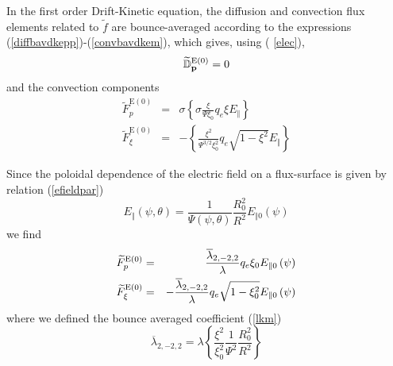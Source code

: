 

In the first order Drift-Kinetic equation, the diffusion and convection flux
elements related to $\widetilde{f}$ are bounce-averaged according to the
expressions (\ref{diffbavdkepp})-(\ref{convbavdkem}), which gives, using (%
\ref{elec}),
\begin{equation}
\widetilde{\Bbb{D}}_{\mathbf{p}}^{\text{E}(0)}=0
\end{equation}
and the convection components
\begin{eqnarray}
\widetilde{F}_{p}^{\text{E}(0)} &=&\sigma \left\{ \sigma \frac{\xi }{\Psi
\xi _{0}}q_{e}\xi E_{\Vert }\right\}  \\
\widetilde{F}_{\xi }^{\text{E}(0)} &=&-\left\{ \frac{\xi ^{2}}{\Psi
^{3/2}\xi _{0}^{2}}q_{e}\sqrt{1-\xi ^{2}}E_{\Vert }\right\}
\end{eqnarray}

Since the poloidal dependence of the electric field on a flux-surface is
given by relation (\ref{efieldpar})
\begin{equation}
E_{\Vert }\left( \psi ,\theta \right) =\frac{1}{\Psi \left( \psi ,\theta
\right) }\frac{R_{0}^{2}}{R^{2}}E_{\Vert 0}\left( \psi \right)
\end{equation}
we find
\begin{eqnarray}
\widetilde{F}_{p}^{\text{E}(0)} &=&\frac{\overline{\lambda }_{2,-2,2}}{%
\lambda }q_{e}\xi _{0}E_{\Vert 0}\left( \psi \right)  \\
\widetilde{F}_{\xi }^{\text{E}(0)} &=&-\frac{\overline{\lambda }_{2,-2,2}}{
\lambda }q_{e}\sqrt{1-\xi _{0}^{2}}E_{\Vert 0}\left( \psi \right)   \nonumber
\end{eqnarray}
where we defined the bounce averaged coefficient (\ref{lkm})
\begin{equation}
\overline{\lambda }_{2,-2,2}=\lambda \left\{ \frac{\xi ^{2}}{\xi _{0}^{2}}%
\frac{1}{\Psi ^{2}}\frac{R_{0}^{2}}{R^{2}}\right\}
\end{equation}

